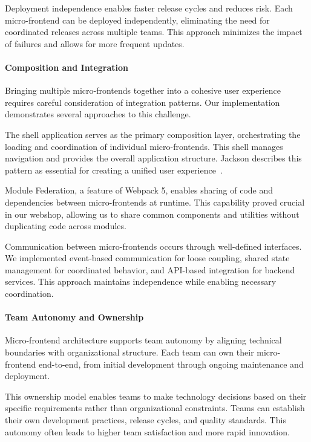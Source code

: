 \documentclass[12pt,a4paper]{report}
\begin{document}
Deployment independence enables faster release cycles and reduces risk. Each micro-frontend can be deployed independently, eliminating the need for coordinated releases across multiple teams. This approach minimizes the impact of failures and allows for more frequent updates.

\paragraph{Composition and Integration}

Bringing multiple micro-frontends together into a cohesive user experience requires careful consideration of integration patterns. Our implementation demonstrates several approaches to this challenge.

The shell application serves as the primary composition layer, orchestrating the loading and coordination of individual micro-frontends. This shell manages navigation and provides the overall application structure. Jackson describes this pattern as essential for creating a unified user experience~\cite{jackson2016microfrontends}.

Module Federation, a feature of Webpack 5, enables sharing of code and dependencies between micro-frontends at runtime. This capability proved crucial in our webshop, allowing us to share common components and utilities without duplicating code across modules.

Communication between micro-frontends occurs through well-defined interfaces. We implemented event-based communication for loose coupling, shared state management for coordinated behavior, and API-based integration for backend services. This approach maintains independence while enabling necessary coordination.

\paragraph{Team Autonomy and Ownership}

Micro-frontend architecture supports team autonomy by aligning technical boundaries with organizational structure. Each team can own their micro-frontend end-to-end, from initial development through ongoing maintenance and deployment.

This ownership model enables teams to make technology decisions based on their specific requirements rather than organizational constraints. Teams can establish their own development practices, release cycles, and quality standards. This autonomy often leads to higher team satisfaction and more rapid innovation.
\end{document}
